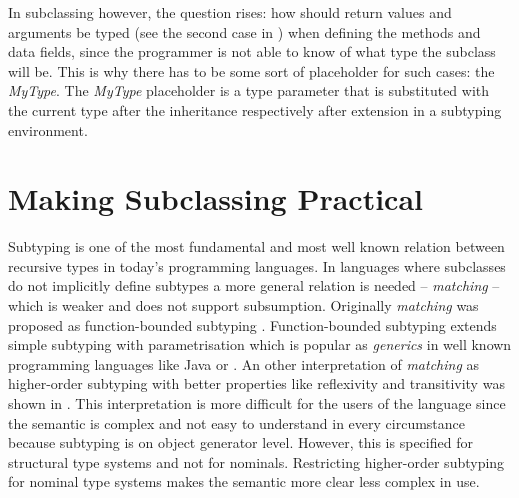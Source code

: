In subclassing however, the question rises: how should return values and
arguments be typed (see the second case in )
when defining the methods and data fields, since the programmer is not
able to know of what type the subclass will be. This is why there has
to be some sort of placeholder for such cases: the \emph{MyType}. The
\emph{MyType} placeholder is a type parameter that is substituted with
the current type after the inheritance respectively after extension in
a subtyping environment.

\section{Making Subclassing Practical}
\label{ctr:makingSubclassingPractical}
Subtyping is one of the most fundamental and most well known relation
between recursive types in today's programming languages. In languages
where subclasses do not implicitly define subtypes a more general
relation is needed -- \emph{matching} -- which is weaker and does
not support subsumption. Originally \emph{matching} was proposed as
function-bounded subtyping \cite{canning_f-bounded_1989}. Function-bounded
subtyping extends simple subtyping with parametrisation which is
popular as \emph{generics} in well known programming languages
like Java or \cs \cite{barron-estrada_inheritance_2003}. An other
interpretation of \emph{matching} as higher-order subtyping with
better properties like reflexivity and transitivity was shown in
\cite{abadi_subtyping_1996}. This interpretation is more
difficult for the users of the language since the semantic is complex
and not easy to understand in every circumstance because subtyping is
on object generator level. However, this is specified for structural
type systems and not for nominals. Restricting higher-order subtyping
for nominal type systems makes the semantic more clear less complex in use.

